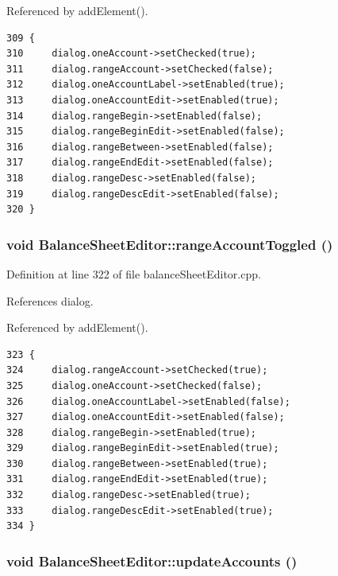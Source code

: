 Referenced by add\-Element().

\footnotesize\begin{verbatim}309 {
310     dialog.oneAccount->setChecked(true);
311     dialog.rangeAccount->setChecked(false);
312     dialog.oneAccountLabel->setEnabled(true);
313     dialog.oneAccountEdit->setEnabled(true);
314     dialog.rangeBegin->setEnabled(false);
315     dialog.rangeBeginEdit->setEnabled(false);
316     dialog.rangeBetween->setEnabled(false);
317     dialog.rangeEndEdit->setEnabled(false);
318     dialog.rangeDesc->setEnabled(false);
319     dialog.rangeDescEdit->setEnabled(false);
320 }
\end{verbatim}\normalsize 


\hypertarget{classBalanceSheetEditor_k6}{
\subsubsection[rangeAccountToggled]{\setlength{\rightskip}{0pt plus 5cm}void Balance\-Sheet\-Editor::range\-Account\-Toggled ()}}
\label{classBalanceSheetEditor_k6}


Definition at line 322 of file balance\-Sheet\-Editor.cpp.

References dialog.

Referenced by add\-Element().

\footnotesize\begin{verbatim}323 {
324     dialog.rangeAccount->setChecked(true);
325     dialog.oneAccount->setChecked(false);
326     dialog.oneAccountLabel->setEnabled(false);
327     dialog.oneAccountEdit->setEnabled(false);
328     dialog.rangeBegin->setEnabled(true);
329     dialog.rangeBeginEdit->setEnabled(true);
330     dialog.rangeBetween->setEnabled(true);
331     dialog.rangeEndEdit->setEnabled(true);
332     dialog.rangeDesc->setEnabled(true);
333     dialog.rangeDescEdit->setEnabled(true);
334 }
\end{verbatim}\normalsize 


\hypertarget{classBalanceSheetEditor_k7}{
\subsubsection[updateAccounts]{\setlength{\rightskip}{0pt plus 5cm}void Balance\-Sheet\-Editor::update\-Accounts ()}}
\label{classBalanceSheetEditor_k7}


